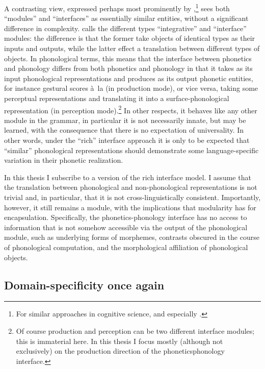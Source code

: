 A contrasting view, expressed perhaps most prominently by \citet{jackendoff87:_consc,jackendoff92:_languag,jackendoff97,jackendoff00:_fodor,jackendoff07:_found},\footnote{For similar approaches in cognitive science, \cf \citet{bever92} and especially \citet{coltheart99:_modul}.} sees both \enquote{modules} and \enquote{interfaces} as essentially similar entities, without a significant difference in complexity. \citet{jackendoff07:_found} calls the different types \enquote{integrative} and \enquote{interface} modules: the difference is that the former take objects of identical types as their inputs and outputs, while the latter effect a translation between different types of objects. In phonological terms, this means that the interface between phonetics and phonology differs from both phonetics and phonology in that it takes as its input phonological representations and produces as its output phonetic entities, for instance gestural scores à~la \citet{browgold90,silverman,hale-reiss2008} (in production mode), or vice versa, taking some perceptual representations and translating it into a surface\hyp phonological representation (in perception mode).\footnote{Of course production and perception can be two different interface modules; this is immaterial here. In  this thesis I focus mostly (although not exclusively) on the production direction of the phonetics\endash phonology interface.} In other respects, it behaves like any other module in the grammar, in particular it is not necessarily innate, but may be learned, with the consequence that there is no expectation of universality. In other words, under the \enquote{rich} interface approach it is only to be expected that \enquote{similar} phonological representations should demonstrate some language\hyp specific variation in their phonetic realization.

In this thesis I subscribe to a version of the rich interface model. I assume that the translation between phonological and non\hyp phonological representations is not trivial and, in particular, that it is not cross\hyp linguistically consistent. Importantly, however, it still remains a module, with the implications that modularity has for encapsulation. Specifically, the phonetics\hyp phonology interface has no access to information that is not somehow accessible via the output of the phonological module, such as underlying forms of morphemes, contrasts obscured in the course of phonological computation, and the morphological affiliation of phonological objects.

\subsection{Domain\hyp specificity once again}
\label{sec:doma-spec-once}

